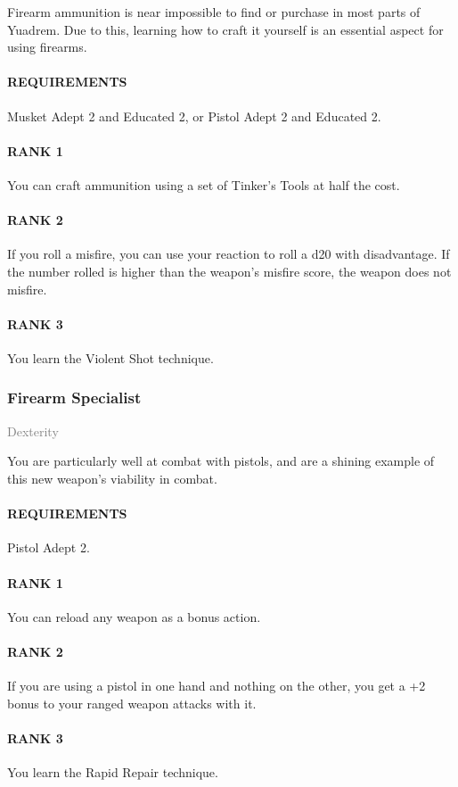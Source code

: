 \normalsize
Firearm ammunition is near impossible to find or purchase in most parts of Yuadrem.
Due to this, learning how to craft it yourself is an essential aspect for using firearms.
\paragraph{REQUIREMENTS} Musket Adept 2 and Educated 2, or Pistol Adept 2 and Educated 2.
\paragraph{RANK 1} You can craft ammunition using a set of Tinker's Tools at half the cost.
\paragraph{RANK 2} If you roll a misfire, you can use your reaction to roll a d20 with disadvantage.
If the number rolled is higher than the weapon's misfire score, the weapon does not misfire.
\paragraph{RANK 3} You learn the Violent Shot technique.

\subsubsection{Firearm Specialist} \label{feat::firearmspecialist}
\small{\textcolor{gray}{Dexterity}}

\normalsize
You are particularly well at combat with pistols, and are a shining example of this new weapon's viability in combat.
\paragraph{REQUIREMENTS} Pistol Adept 2.
\paragraph{RANK 1} You can reload any weapon as a bonus action.
\paragraph{RANK 2} If you are using a pistol in one hand and nothing on the other, you get a +2 bonus to your ranged weapon attacks with it.
\paragraph{RANK 3} You learn the Rapid Repair technique.

